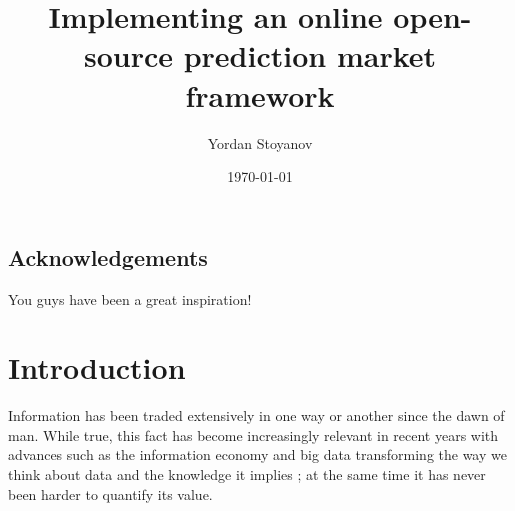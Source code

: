 \documentclass[bsc,frontabs,twoside,singlespacing,parskip,deptreport]{infthesis}     %
\begin{document}
\title{Implementing an online open-source prediction market framework}

\author{Yordan Stoyanov}



\date{\today}


\maketitle

\section*{Acknowledgements}
You guys have been a great inspiration!

\tableofcontents



\chapter{Introduction}

Information has been traded extensively in one way or another since the dawn of man. While true, this fact has become increasingly relevant in recent years with advances such as the information economy and big data transforming the way we think about data and the knowledge it implies \cite{mcgee_managing_1993}; at the same time it has never been harder to quantify its value. 
\end{document}
